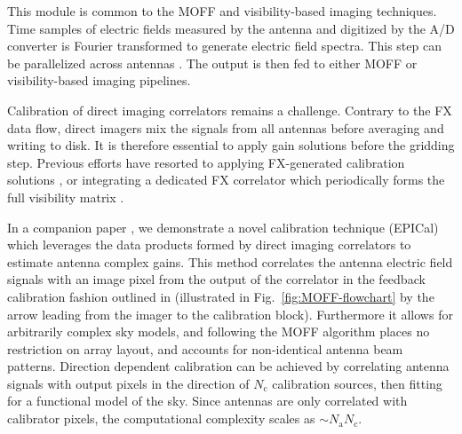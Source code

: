 \documentclass[a4paper,fleqn,usenatbib]{mnras}
\begin{document}
\par\medskip
{}
\par\medskip
\noindent This module is common to the MOFF and visibility-based imaging 
techniques. Time samples of electric fields measured by the antenna and 
digitized by the A/D converter is Fourier transformed to generate electric 
field spectra. This step can be parallelized across antennas%
. The output is then fed to either MOFF or 
visibility-based imaging pipelines.


\par\medskip
{}
\par\medskip
\noindent Calibration of direct imaging correlators remains a challenge. Contrary
to the FX data flow, direct imagers mix the signals from all antennas before
averaging and writing to disk. It is therefore essential to apply gain solutions 
before the gridding step. Previous efforts have resorted to applying FX-generated
calibration solutions \citep{zhe14,fos14}, or integrating a dedicated FX 
correlator which periodically forms the full visibility matrix 
\citep{wij09,dev09}. 

In a companion paper \citep{bea16}, we demonstrate a novel calibration 
technique (EPICal) which leverages the data products formed by direct imaging 
correlators to estimate antenna complex gains. This method correlates the antenna 
electric field signals with an image pixel from the output of the correlator in 
the feedback calibration fashion outlined in \citealt{mor11} (illustrated in 
Fig.~\ref{fig:MOFF-flowchart} by the arrow leading from the imager to the 
calibration block). Furthermore it allows for arbitrarily complex sky models, 
and following the MOFF algorithm places no restriction on array layout, and 
accounts for non-identical antenna beam patterns. Direction dependent calibration 
can be achieved by correlating antenna signals with output pixels in the 
direction of $N_\textrm{c}$ calibration sources, then fitting for a functional 
model of the sky. Since antennas are only correlated with calibrator pixels, the 
computational complexity scales as $\sim N_\textrm{a} N_\textrm{c}$. 
\end{document}

